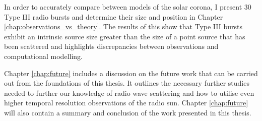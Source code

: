 In order to accurately compare between models of the solar corona, I present 30 Type III radio bursts and determine their size and position in Chapter \ref{chap:observations_vs_theory}. The results of this show that Type III bursts exhibit an intrinsic source size greater than the size of a point source that has been scattered and highlights discrepancies between observations and computational modelling.

Chapter \ref{chap:future} includes a discussion on the future work that can be carried out from the foundations of this thesis. It outlines the necessary further studies needed to further our knowledge of radio wave scattering and how to utilise even higher temporal resolution observations of the radio sun. Chapter \ref{chap:future} will also contain a summary and conclusion of the work presented in this thesis.

